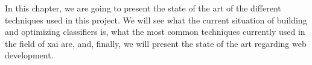 In this chapter, we are going to present the state of the art of the different techniques used in this project. We will see what the current situation of building and optimizing classifiers is, what the most common techniques currently used in the field of \ac{xai} are, and, finally, we will present the state of the art regarding web development.